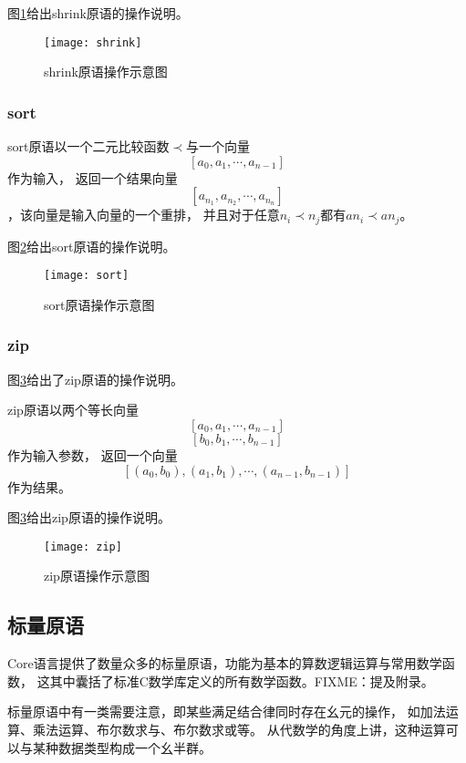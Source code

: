 图\ref{fig:shrink-diagram}给出shrink原语的操作说明。
\begin{figure}[h]
  \centering
  \texttt{[image: shrink]}
  \caption{shrink原语操作示意图}
  \label{fig:shrink-diagram}
\end{figure}

\subsubsection{sort}
\begin{definition}
  sort原语以一个二元比较函数$\prec$与一个向量$$[a_0, a_1, \cdots, a_{n-1}]$$作为输入，
  返回一个结果向量$$[a_{n_1}, a_{n_2}, \cdots, a_{n_n}]$$，该向量是输入向量的一个重排，
  并且对于任意$n_i\prec{}n_j$都有$a{n_i}\prec{}a{n_j}$。
\end{definition}

图\ref{fig:sort-diagram}给出sort原语的操作说明。
\begin{figure}[h]
  \centering
  \texttt{[image: sort]}
  \caption{sort原语操作示意图}
  \label{fig:sort-diagram}
\end{figure}

\subsubsection{zip}
图\ref{fig:zip-diagram}给出了zip原语的操作说明。
\begin{definition}
  zip原语以两个等长向量$$[a_0, a_1, \cdots, a_{n-1}]$$ $$[b_0, b_1, \cdots, b_{n-1}]$$作为输入参数，
  返回一个向量$$[(a_0, b_0), (a_1, b_1), \cdots, (a_{n-1}, b_{n-1})]$$作为结果。
\end{definition}

图\ref{fig:zip-diagram}给出zip原语的操作说明。
\begin{figure}[h]
  \centering
  \texttt{[image: zip]}
  \caption{zip原语操作示意图}
  \label{fig:zip-diagram}
\end{figure}

\subsection{标量原语}\label{subsec:scalar-primitives}
Core语言提供了数量众多的标量原语，功能为基本的算数逻辑运算与常用数学函数，
这其中囊括了标准C数学库定义的所有数学函数。FIXME：提及附录。

标量原语中有一类需要注意，即某些满足结合律同时存在幺元的操作，
如加法运算、乘法运算、布尔数求与、布尔数求或等。
从代数学的角度上讲，这种运算可以与某种数据类型构成一个幺半群。

